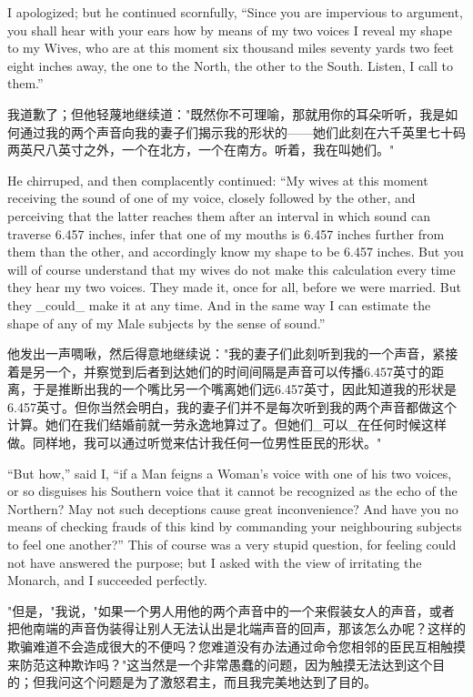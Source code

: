 \documentclass[12pt,UTF8]{ctexbook}
\begin{document}
I apologized; but he continued scornfully, ``Since you are impervious to argument, you shall hear with your ears how by means of my two voices I reveal my shape to my Wives, who are at this moment six thousand miles seventy yards two feet eight inches away, the one to the North, the other to the South. Listen, I call to them.''

我道歉了；但他轻蔑地继续道："既然你不可理喻，那就用你的耳朵听听，我是如何通过我的两个声音向我的妻子们揭示我的形状的——她们此刻在六千英里七十码两英尺八英寸之外，一个在北方，一个在南方。听着，我在叫她们。"

He chirruped, and then complacently continued: ``My wives at this moment receiving the sound of one of my voice, closely followed by the other, and perceiving that the latter reaches them after an interval in which sound can traverse 6.457 inches, infer that one of my mouths is 6.457 inches further from them than the other, and accordingly know my shape to be 6.457 inches. But you will of course understand that my wives do not make this calculation every time they hear my two voices. They made it, once for all, before we were married. But they \_could\_ make it at any time. And in the same way I can estimate the shape of any of my Male subjects by the sense of sound.''

他发出一声啁啾，然后得意地继续说："我的妻子们此刻听到我的一个声音，紧接着是另一个，并察觉到后者到达她们的时间间隔是声音可以传播6.457英寸的距离，于是推断出我的一个嘴比另一个嘴离她们远6.457英寸，因此知道我的形状是6.457英寸。但你当然会明白，我的妻子们并不是每次听到我的两个声音都做这个计算。她们在我们结婚前就一劳永逸地算过了。但她们\_可以\_在任何时候这样做。同样地，我可以通过听觉来估计我任何一位男性臣民的形状。"

``But how,'' said I, ``if a Man feigns a Woman's voice with one of his two voices, or so disguises his Southern voice that it cannot be recognized as the echo of the Northern? May not such deceptions cause great inconvenience? And have you no means of checking frauds of this kind by commanding your neighbouring subjects to feel one another?'' This of course was a very stupid question, for feeling could not have answered the purpose; but I asked with the view of irritating the Monarch, and I succeeded perfectly.

"但是，"我说，"如果一个男人用他的两个声音中的一个来假装女人的声音，或者把他南端的声音伪装得让别人无法认出是北端声音的回声，那该怎么办呢？这样的欺骗难道不会造成很大的不便吗？您难道没有办法通过命令您相邻的臣民互相触摸来防范这种欺诈吗？"这当然是一个非常愚蠢的问题，因为触摸无法达到这个目的；但我问这个问题是为了激怒君主，而且我完美地达到了目的。
\end{document}
